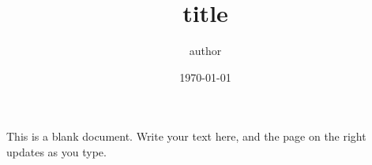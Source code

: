 \documentclass[11pt]{article}
\title{{{title}}}
\author{{{author}}}
\date{\today}
\begin{document}
\maketitle

This is a blank document. Write your text here, and the page on the right updates as you type.
\end{document}
